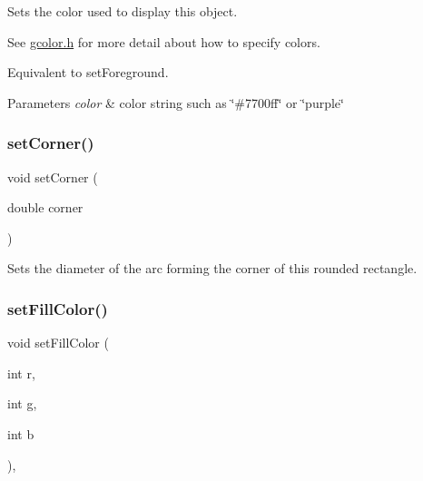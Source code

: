 Sets the color used to display this object. 

See \mbox{\hyperlink{gcolor_8h_source}{gcolor.\+h}} for more detail about how to specify colors.

Equivalent to set\+Foreground.


\begin{DoxyParams}{Parameters}
{\em color} & color string such as \char`\"{}\#7700ff\char`\"{} or \char`\"{}purple\char`\"{} \\
\hline
\end{DoxyParams}
\mbox{\label{classsgl_1_1GRoundRect_ab1cc6c77629d0e8ded56139a1866be48}} 
\subsubsection{\texorpdfstring{set\+Corner()}{setCorner()}}
{\footnotesize\ttfamily void set\+Corner (\begin{DoxyParamCaption}\item[{double}]{corner }\end{DoxyParamCaption})\hspace{0.3cm}{\ttfamily [virtual]}}



Sets the diameter of the arc forming the corner of this rounded rectangle. 

\mbox{\label{classsgl_1_1GObject_ad767a33971159e9493e221cca4c00ae9}} 
\subsubsection{\texorpdfstring{set\+Fill\+Color()}{setFillColor()}\hspace{0.1cm}{\footnotesize\ttfamily [1/3]}}
{\footnotesize\ttfamily void set\+Fill\+Color (\begin{DoxyParamCaption}\item[{int}]{r,  }\item[{int}]{g,  }\item[{int}]{b }\end{DoxyParamCaption})\hspace{0.3cm}{\ttfamily [virtual]}, {\ttfamily [inherited]}}



